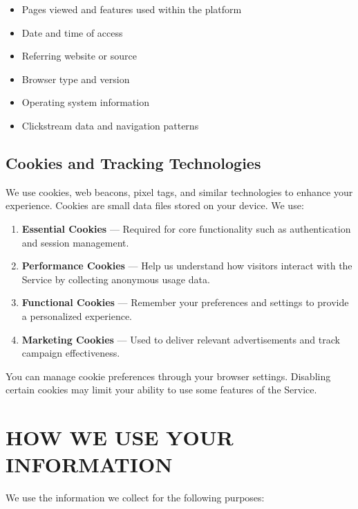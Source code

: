 \documentclass[
    language=english,
    doctype=privacy-policy,
    institution=none,
]{../../omnilatex}
\begin{document}
\begin{itemize}
    \item Pages viewed and features used within the platform
    \item Date and time of access
    \item Referring website or source
    \item Browser type and version
    \item Operating system information
    \item Clickstream data and navigation patterns
\end{itemize}

\subsection{Cookies and Tracking Technologies}
We use cookies, web beacons, pixel tags, and similar technologies to enhance your experience. Cookies are small data files stored on your device. We use:

\begin{enumerate}
    \item \textbf{Essential Cookies} --- Required for core functionality such as authentication and session management.
    \item \textbf{Performance Cookies} --- Help us understand how visitors interact with the Service by collecting anonymous usage data.
    \item \textbf{Functional Cookies} --- Remember your preferences and settings to provide a personalized experience.
    \item \textbf{Marketing Cookies} --- Used to deliver relevant advertisements and track campaign effectiveness.
\end{enumerate}

You can manage cookie preferences through your browser settings. Disabling certain cookies may limit your ability to use some features of the Service.

\section{HOW WE USE YOUR INFORMATION}

We use the information we collect for the following purposes:
\end{document}
